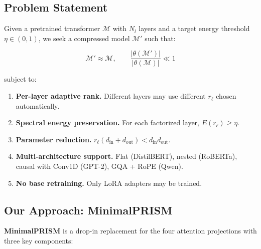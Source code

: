 \subsection{Problem Statement}

Given a pretrained transformer $\mathcal{M}$ with $N_l$ layers and a target 
energy threshold $\eta \in (0, 1)$, we seek a compressed model 
$\mathcal{M}'$ such that:

\[
\mathcal{M}' \approx \mathcal{M}, \qquad
\frac{|\theta(\mathcal{M}')|}{|\theta(\mathcal{M})|} \ll 1
\tag{1.3}
\]

subject to:

\begin{enumerate}
\item \textbf{Per-layer adaptive rank.} Different layers may use different
  $r_\ell$ chosen automatically.
\item \textbf{Spectral energy preservation.} For each factorized layer,
  $E(r_\ell) \geq \eta$.
\item \textbf{Parameter reduction.} $r_\ell (d_\text{in} + d_\text{out}) < d_\text{in} d_\text{out}$.
\item \textbf{Multi-architecture support.} Flat (DistilBERT), nested (RoBERTa),
  causal with Conv1D (GPT-2), GQA + RoPE (Qwen).
\item \textbf{No base retraining.} Only LoRA adapters may be trained.

\end{enumerate}
\subsection{Our Approach: MinimalPRISM}

\textbf{MinimalPRISM} is a drop-in replacement for the four attention projections 
with three key components:

